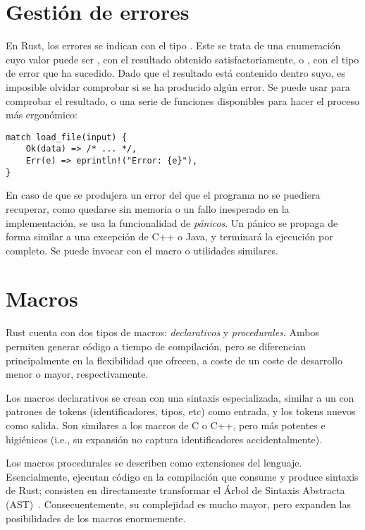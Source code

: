 \section{Gestión de errores}

En Rust, los errores se indican con el tipo . Este se trata
de una enumeración cuyo valor puede ser , con el resultado obtenido
satisfactoriamente, o , con el tipo de error que ha sucedido. Dado
que el resultado está contenido dentro suyo, es imposible olvidar comprobar si
se ha producido algún error. Se puede usar  para comprobar el
resultado, o una serie de funciones disponibles para hacer el proceso más
ergonómico:

\begin{verbatim}
match load_file(input) {
    Ok(data) => /* ... */,
    Err(e) => eprintln!("Error: {e}"),
}
\end{verbatim}

En caso de que se produjera un error del que el programa no se puediera
recuperar, como quedarse sin memoria o un fallo inesperado en la implementación,
se usa la funcionalidad de \emph{pánicos}. Un pánico se propaga de forma similar
a una excepción de C++ o Java, y terminará la ejecución por completo. Se puede
invocar con el macro  o utilidades similares.

\section{Macros}

Rust cuenta con dos tipos de macros: \emph{declarativos} y \emph{procedurales}.
Ambos permiten generar código a tiempo de compilación, pero se diferencian
principalmente en la flexibilidad que ofrecen, a coste de un coste de desarrollo
menor o mayor, respectivamente.

Los macros declarativos se crean con una sintaxis especializada, similar a un
 con patrones de tokens (identificadores, tipos, etc) como entrada,
y los tokens nuevos como salida. Son similares a los macros de C o C++, pero más
potentes e higiénicos (i.e., su expansión no captura identificadores
accidentalmente).

Los macros procedurales se describen como extensiones del lenguaje.
Esencialmente, ejecutan código en la compilación que consume y produce sintaxis
de Rust; consisten en directamente transformar el Árbol de Sintaxis Abstracta
(AST)~\cite{procmacrosref}. Consecuentemente, su complejidad es mucho mayor,
pero expanden las posibilidades de los macros enormemente.

